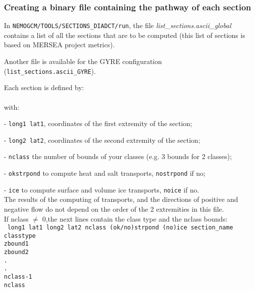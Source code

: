 \documentclass[../tex_main/NEMO_manual]{subfiles}
\begin{document}
\subsubsection{Creating a binary file containing the pathway of each section}

In \texttt{NEMOGCM/TOOLS/SECTIONS\_DIADCT/run}, 
the file \textit{ {list\_sections.ascii\_global}} contains a list of all the sections that are to 
be computed (this list of sections is based on MERSEA project metrics).

Another file is available for the GYRE configuration (\texttt{ {list\_sections.ascii\_GYRE}}).

Each section is defined by: \\
 \\
with:

 - \texttt{long1 lat1}, coordinates of the  first extremity of the section;

 - \texttt{long2 lat2}, coordinates of the second extremity of the section;

 - \texttt{nclass}    the number of bounds of your classes (e.g. 3 bounds for 2 classes);

 - \texttt{okstrpond} to compute    heat and       salt transports, \texttt{nostrpond} if no;

 - \texttt{ice}       to compute surface and volume ice transports, \texttt{noice}     if no. \\

\noindent The results of the computing of transports, and the directions of positive and 
negative flow do not depend on the order of the 2 extremities in this file. \\

\noindent If nclass $\neq$ 0,the next lines contain the class type and the nclass bounds: \\
{\scriptsize \texttt{
long1 lat1 long2 lat2 nclass (ok/no)strpond (no)ice section\_name \\
classtype                                                         \\
zbound1                                                           \\
zbound2                                                           \\
.                                                                 \\
.                                                                 \\
nclass-1                                                          \\
nclass}}
\end{document}
